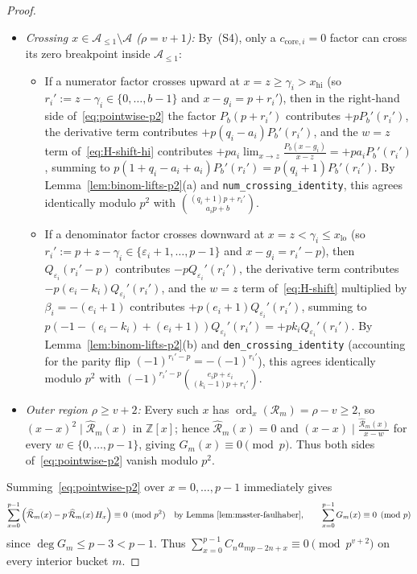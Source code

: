 \documentclass[11pt,reqno]{amsart}
\theoremstyle{definition}
\theoremstyle{remark}
\newcommand{\ZZ}{\mathbb{Z}}
\newcommand{\ord}{\operatorname{ord}}
\begin{document}
\begin{proof}
\begin{enumerate}
\begin{itemize}
    \item \emph{Crossing $x \in \mathcal{A}_{\le 1} \setminus \mathcal{A}$ ($\rho = v + 1$):} By~(S4), only a $c_{\mathrm{core}, i} = 0$ factor can cross its zero breakpoint inside $\mathcal{A}_{\le 1}$:
      \begin{itemize}
        \item If a numerator factor crosses upward at $x = z \ge \gamma_i > x_{\mathrm{hi}}$ (so $r_i' := z - \gamma_i \in \{0, \ldots, b-1\}$ and $x - g_i = p + r_i'$), then in the right-hand side of~\eqref{eq:pointwise-p2} the factor $P_b(p + r_i')$ contributes $+p P_b'(r_i')$, the derivative term contributes $+p(q_i - a_i) P_b'(r_i')$, and the $w = z$ term of~\eqref{eq:H-shift-hi} contributes $+p a_i \lim_{x \to z}\frac{P_b(x - g_i)}{x - z} = +p a_i P_b'(r_i')$, summing to $p(1 + q_i - a_i + a_i)P_b'(r_i') = p(q_i + 1)P_b'(r_i')$. By Lemma~\ref{lem:binom-lifts-p2}(a) and \texttt{num\_crossing\_identity}, this agrees identically modulo $p^2$ with $\binom{(q_i+1)p + r_i'}{a_i p + b}$.
        \item If a denominator factor crosses downward at $x = z < \gamma_i \le x_{\mathrm{lo}}$ (so $r_i' := p + z - \gamma_i \in \{\varepsilon_i + 1, \ldots, p-1\}$ and $x - g_i = r_i' - p$), then $Q_{\varepsilon_i}(r_i' - p)$ contributes $-p Q_{\varepsilon_i}'(r_i')$, the derivative term contributes $-p(e_i - k_i) Q_{\varepsilon_i}'(r_i')$, and the $w = z$ term of~\eqref{eq:H-shift} multiplied by $\beta_i = -(e_i + 1)$ contributes $+p(e_i + 1) Q_{\varepsilon_i}'(r_i')$, summing to $p(-1 - (e_i - k_i) + (e_i + 1)) Q_{\varepsilon_i}'(r_i') = +p k_i Q_{\varepsilon_i}'(r_i')$. By Lemma~\ref{lem:binom-lifts-p2}(b) and \texttt{den\_crossing\_identity} (accounting for the parity flip $(-1)^{r_i' - p} = -(-1)^{r_i'}$), this agrees identically modulo $p^2$ with $(-1)^{r_i' - p}\binom{e_i p + \varepsilon_i}{(k_i - 1)p + r_i'}$.
      \end{itemize}
    \item \emph{Outer region $\rho \ge v + 2$:} Every such $x$ has $\ord_x(\mathcal{R}_m) = \rho - v \ge 2$, so $(x - x)^2 \mid \widehat{\mathcal{R}}_m(x)$ in $\ZZ[x]$; hence $\widehat{\mathcal{R}}_m(x) = 0$ and $(x - x) \mid \frac{\widehat{\mathcal{R}}_m(x)}{x - w}$ for every $w \in \{0, \ldots, p-1\}$, giving $G_m(x) \equiv 0 \pmod p$. Thus both sides of~\eqref{eq:pointwise-p2} vanish modulo $p^2$.
  \end{itemize}
\end{enumerate}
Summing~\eqref{eq:pointwise-p2} over $x = 0, \ldots, p - 1$ immediately gives
\[
  \sum_{x=0}^{p-1} \left(\widehat{\mathcal{R}}_m(x) - p\,\widehat{\mathcal{R}}_m(x)\, H_x\right) \equiv 0 \pmod{p^2}
  \quad\text{by Lemma~\ref{lem:master-faulhaber}},
  \qquad
  \sum_{x=0}^{p-1} G_m(x) \equiv 0 \pmod p
\]
since $\deg G_m \le p - 3 < p - 1$. Thus $\sum_{x=0}^{p-1} C_n a_{mp-2n+x} \equiv 0 \pmod{p^{v+2}}$ on every interior bucket $m$.


\end{proof}
\end{document}

